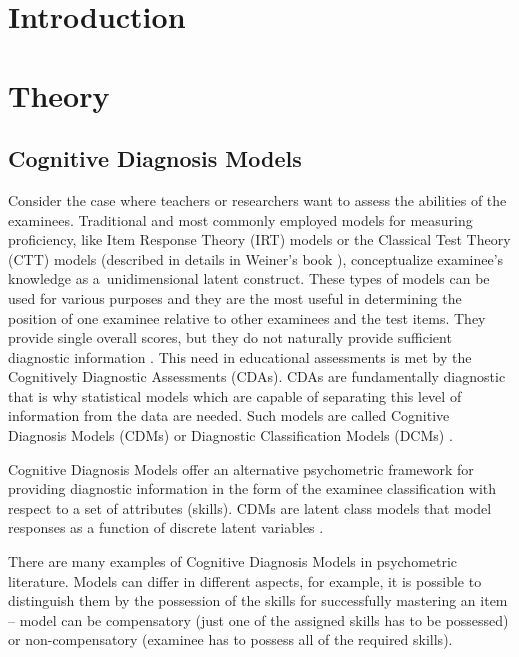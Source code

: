 \documentclass[english]{pwr_wmat_praca_dyplomowa}
\theoremstyle{plain}
\theoremstyle{definition}
\numberwithin{theorem}{chapter}
\begin{document}
\frontmatter
\maketitle
\mainmatter
\tableofcontents
{\backmatter \chapter{Introduction}}

\chapter{Theory}

\section{Cognitive Diagnosis Models}

Consider the case where teachers or researchers want to assess the abilities of the examinees. Traditional and most commonly employed models for measuring proficiency, like Item Response Theory (IRT) models or the Classical Test Theory (CTT) models (described in details in Weiner's book \cite{irt_ctt}), conceptualize examinee's knowledge as a~unidimensional latent construct. These types of models can be used for various purposes and they are the most useful in determining the position of one examinee relative to other examinees and the test items. They provide single overall scores, but they do not naturally provide sufficient diagnostic information \cite{de_la_torre_2016}. This need in educational assessments is met by the Cognitively Diagnostic Assessments (CDAs). CDAs are fundamentally diagnostic that is why statistical models which are capable of separating this level of information from the data are needed. Such models are called Cognitive Diagnosis Models (CDMs) or Diagnostic Classification Models (DCMs) \cite{de_la_torre_2014,dino_model}. 

Cognitive Diagnosis Models offer an alternative psychometric framework for providing diagnostic information in the form of the examinee classification with respect to a set of attributes (skills). CDMs are latent class models that model responses as a function of discrete latent variables \cite{de_la_torre_2014}. 

There are many examples of Cognitive Diagnosis Models in psychometric literature. Models can differ in different aspects, for example, it is possible to distinguish them by the possession of the skills for successfully mastering an item -- model can be compensatory (just one of the assigned skills has to be possessed) or non-compensatory (examinee has to possess all of the required skills). 
\end{document}
